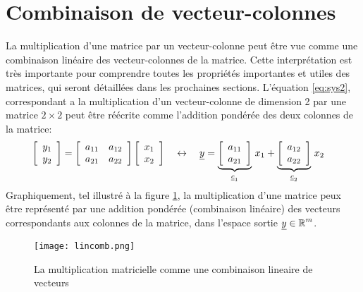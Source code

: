 \section{Combinaison de vecteur-colonnes}
\label{sec:combveccol}

La multiplication d'une matrice par un vecteur-colonne peut être vue comme une combinaison linéaire des vecteur-colonnes de la matrice. Cette interprétation est très importante pour comprendre toutes les propriétés importantes et utiles des matrices, qui seront détaillées dans les prochaines sections. L’équation \eqref{eq:sys2}, correspondant a la multiplication d'un vecteur-colonne de dimension 2 par une matrice $2\times2$ peut être réécrite comme l'addition pondérée des deux colonnes de la matrice:
%
\begin{align}
\left[ \begin{array}{c} 
	y_1 \\ y_2
\end{array} \right] &= 
\left[ \begin{array}{c c} 
a_{11} & a_{12} \\ a_{21} & a_{22}
\end{array} \right]
\left[ \begin{array}{c} 
	x_1 \\ x_2
\end{array} \right] \quad \leftrightarrow \quad  \col{y}  =   
%
\underbrace{\left[ \begin{array}{c} 
	a_{11} \\ a_{21}
\end{array} \right]}_{\col{c}_1} \, x_1 +
\underbrace{\left[ \begin{array}{c} 
	a_{12} \\ a_{22}
\end{array} \right]}_{\col{c}_2} \, x_2
\label{eq:sys2-col}
\end{align}
%
Graphiquement, tel illustré à la figure \ref{fig:lincomb}, la multiplication d'une matrice peux être représenté par une addition pondérée (combinaison linéaire) des vecteurs correspondants aux colonnes de la matrice, dans l'espace sortie $\underline{y} \in \operatorname{\mathbb{R}}^m$.

\begin{figure}[H]
	\centering
		\texttt{[image: lincomb.png]}
	\caption{La multiplication matricielle comme une combinaison lineaire de vecteurs}
	\label{fig:lincomb}
\end{figure}

